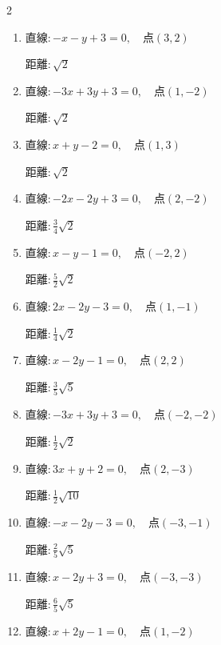 \begin{multicols}{2}
\begin{enumerate}
\columnbreak %

  \item $直線:-x-y+3=0,\quad 点 ( 3, 2 )$

        $\displaystyle 距離 : \sqrt{2}$

  \item $直線:-3x+3y+3=0,\quad 点 ( 1, -2 )$

        $\displaystyle 距離 : \sqrt{2}$

  \item $直線:x+y-2=0,\quad 点 ( 1, 3 )$

        $\displaystyle 距離 : \sqrt{2}$

  \item $直線:-2x-2y+3=0,\quad 点 ( 2, -2 )$

        $\displaystyle 距離 : \frac{3}{4}\sqrt{2}$

  \item $直線:x-y-1=0,\quad 点 ( -2, 2 )$

        $\displaystyle 距離 : \frac{5}{2}\sqrt{2}$

  \item $直線:2x-2y-3=0,\quad 点 ( 1, -1 )$

        $\displaystyle 距離 : \frac{1}{4}\sqrt{2}$

  \item $直線:x-2y-1=0,\quad 点 ( 2, 2 )$

        $\displaystyle 距離 : \frac{3}{5}\sqrt{5}$

  \item $直線:-3x+3y+3=0,\quad 点 ( -2, -2 )$

        $\displaystyle 距離 : \frac{1}{2}\sqrt{2}$

  \item $直線:3x+y+2=0,\quad 点 ( 2, -3 )$

        $\displaystyle 距離 : \frac{1}{2}\sqrt{10}$

  \item $直線:-x-2y-3=0,\quad 点 ( -3, -1 )$

        $\displaystyle 距離 : \frac{2}{5}\sqrt{5}$

\columnbreak %

\resetques

  \item $直線:x-2y+3=0,\quad 点 ( -3, -3 )$

        $\displaystyle 距離 : \frac{6}{5}\sqrt{5}$

  \item $直線:x+2y-1=0,\quad 点 ( 1, -2 )$


\end{enumerate}
\end{multicols}
